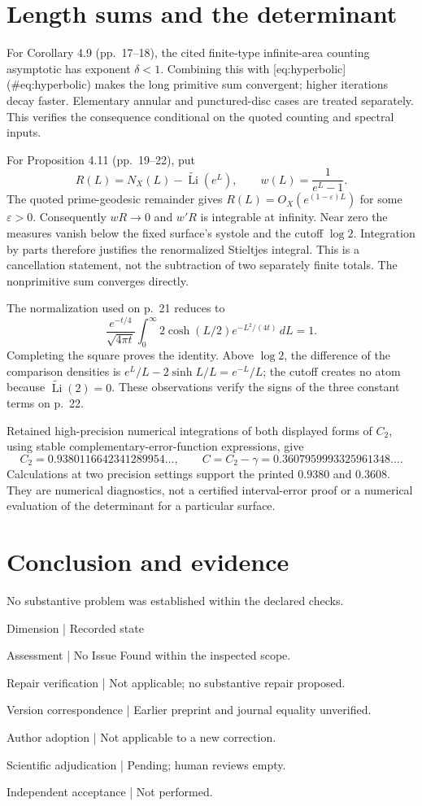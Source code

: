 \documentclass[10pt]{article}
\begin{document}
\section*{Length sums and the determinant}
For Corollary 4.9 (pp. 17–18), the cited finite-type infinite-area counting asymptotic has exponent \(\delta<1\). Combining this with [eq:hyperbolic] (\#eq:hyperbolic) makes the long primitive sum convergent; higher iterations decay faster. Elementary annular and punctured-disc cases are treated separately. This verifies the consequence conditional on the quoted counting and spectral inputs.\par
For Proposition 4.11 (pp. 19–22), put \[R(L)=N_X(L)-\widetilde{\operatorname{Li}}(e^L),\qquad w(L)=\frac{1}{e^L-1}.\] The quoted prime-geodesic remainder gives \(R(L)=O_X(e^{(1-\varepsilon)L})\) for some \(\varepsilon>0\). Consequently \(wR\to0\) and \(w'R\) is integrable at infinity. Near zero the measures vanish below the fixed surface’s systole and the cutoff \(\log2\). Integration by parts therefore justifies the renormalized Stieltjes integral. This is a cancellation statement, not the subtraction of two separately finite totals. The nonprimitive sum converges directly.\par
The normalization used on p. 21 reduces to \[\frac{e^{-t/4}}{\sqrt{4\pi t}}
 \int_0^\infty2\cosh(L/2)e^{-L^2/(4t)}\,dL=1.\] Completing the square proves the identity. Above \(\log2\), the difference of the comparison densities is \(e^L/L-2\sinh L/L=e^{-L}/L\); the cutoff creates no atom because \(\widetilde{\operatorname{Li}}(2)=0\). These observations verify the signs of the three constant terms on p. 22.\par
Retained high-precision numerical integrations of both displayed forms of \(C_2\), using stable complementary-error-function expressions, give \[C_2=0.9380116642341289954\ldots,\qquad
 C=C_2-\gamma=0.3607959993325961348\ldots.\] Calculations at two precision settings support the printed \(0.9380\) and \(0.3608\). They are numerical diagnostics, not a certified interval-error proof or a numerical evaluation of the determinant for a particular surface.\par
\section*{Conclusion and evidence}
No substantive problem was established within the declared checks.\par
Dimension | Recorded state\par
Assessment | No Issue Found within the inspected scope.\par
Repair verification | Not applicable; no substantive repair proposed.\par
Version correspondence | Earlier preprint and journal equality unverified.\par
Author adoption | Not applicable to a new correction.\par
Scientific adjudication | Pending; human reviews empty.\par
Independent acceptance | Not performed.\par
\end{document}
